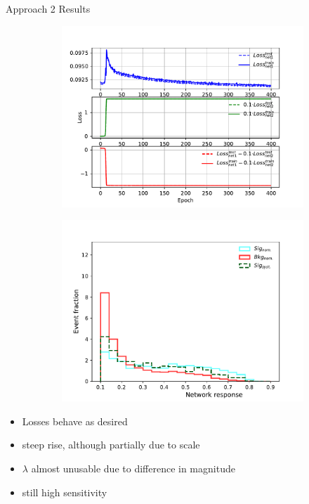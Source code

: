 \begin{frame}{Approach 2 Results}
    \begin{figure}[htbp]
    \centering
    \begin{subfigure}[b]{0.47\textwidth}
        \includegraphics[width=\textwidth]{app2/app2_losses2.pdf}
        \label{fig:simple:final:sepa}
    \end{subfigure}
\quad
    \begin{subfigure}[b]{0.47\textwidth}
        \includegraphics[width=\textwidth]{app2/app2_syst.pdf}
        \label{fig:simple:final:syst}
    \end{subfigure}
    \end{figure}
        \begin{itemize}
            \item Losses behave as desired
            \item steep rise, although partially due to scale
            \item $\lambda$ almost unusable due to difference in magnitude
            \item still high sensitivity
        \end{itemize}
\end{frame}


